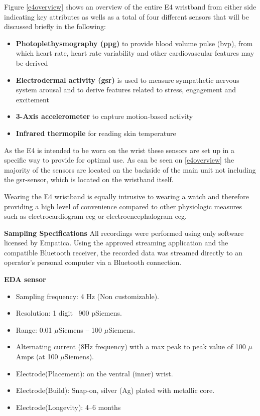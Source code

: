 Figure \ref{e4overview} shows an overview of the entire E4 wristband from either side indicating key attributes as wells as a total of four different sensors that will be discussed briefly in the following:

\begin{itemize}
\item \textbf{Photoplethysmography (\gls{ppg})} to provide blood volume pulse (\gls{bvp}), from which heart rate, heart rate variability and other cardiovascular features may be derived
\item \textbf{Electrodermal activity (\gls{gsr})} is used to measure sympathetic nervous system arousal and to derive features related to stress, engagement and excitement
\item \textbf{3-Axis accelerometer} to capture motion-based activity
\item \textbf{Infrared thermopile} for reading skin temperature
\end{itemize}

As the E4 is intended to be worn on the wrist these sensors are set up in a specific way to provide for optimal use. As can be seen on \ref{e4overview} the majority of the sensors are located on the backside of the main unit not including the \gls{gsr}-sensor, which is located on the wristband itself. 

Wearing the E4 wristband is equally intrusive to wearing a watch and therefore providing a high level of convenience compared to other physiologic measures such as electrocardiogram \gls{ecg} or electroencephalogram \gls{eeg}.

\textbf{Sampling Specifications}
All recordings were performed using only software licensed by Empatica. Using the approved streaming application and the compatible Bluetooth receiver, the recorded data was streamed directly to an operator's personal computer via a Bluetooth connection. 

\textbf{EDA sensor}
\begin{itemize}
\item Sampling frequency: 4 Hz (Non customizable).
\item Resolution: 1 digit ~900 pSiemens.
\item Range: 0.01 $\mu$Siemens – 100 $\mu$Siemens.
\item Alternating current (8Hz frequency) with a
max peak to peak value of 100 $\mu$Amps (at 100
$\mu$Siemens).
\item Electrode(Placement): on the ventral (inner) wrist.
\item Electrode(Build): Snap-on, silver (Ag) plated with metallic core.
\item Electrode(Longevity): 4–6 months
\end{itemize}

